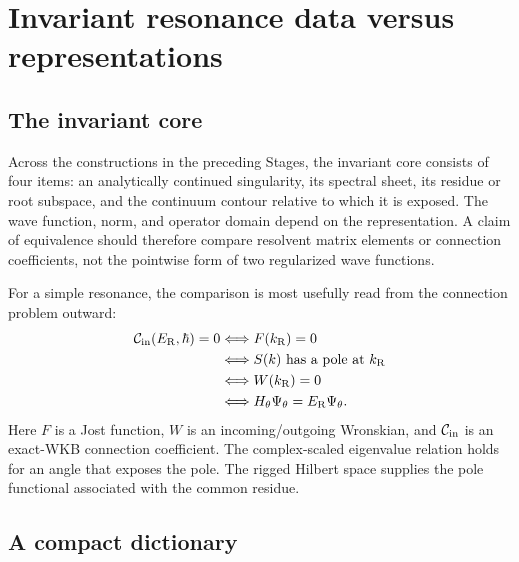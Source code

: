 \section{Invariant resonance data versus representations}
\label{sec:unified-dictionary}

\subsection{The invariant core}
\label{subsec:invariant-core}

Across the constructions in the preceding Stages, the invariant core consists
of four items:
an analytically continued singularity, its spectral sheet, its residue or root
subspace, and the continuum contour relative to which it is exposed.  The
wave function, norm, and operator domain depend on the representation.  A
claim of equivalence should therefore compare resolvent matrix elements or
connection coefficients, not the pointwise form of two regularized wave
functions.

For a simple resonance, the comparison is most usefully read from the
connection problem outward:
\begin{align}
  \mathcal{C}_{\mathrm{in}}(E_{\mathrm{R}},\hbar)=0
  &\Longleftrightarrow
  F(k_{\mathrm R})=0
  \notag\\
  &\Longleftrightarrow
  S(k)\text{ has a pole at }k_{\mathrm R}
  \notag\\
  &\Longleftrightarrow
  W(k_{\mathrm R})=0
  \notag\\
  &\Longleftrightarrow
  H_\theta\Psi_\theta
  =E_{\mathrm{R}}\Psi_\theta .
  \label{eq:full-pole-chain}
\end{align}
Here $F$ is a Jost function, $W$ is an incoming/outgoing Wronskian, and
$\mathcal{C}_{\mathrm{in}}$ is an exact-WKB connection coefficient.  The complex-scaled
eigenvalue relation holds for an angle that exposes the pole.  The rigged
Hilbert space supplies the pole functional associated with the common residue.

\subsection{A compact dictionary}
\label{subsec:compact-dictionary}


